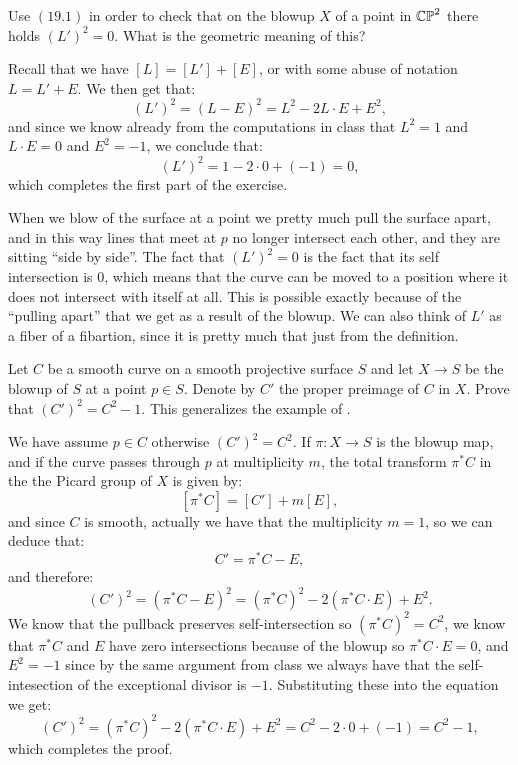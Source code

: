 \documentclass[11pt, a4paper]{article}
\begin{document}
\begin{exercise}
  \label{ex:nine-one}
  Use $(19.1)$ in order to check that on the blowup $X$ of a point
  in $\mathbb{CP}^2$ there holds $(L')^2 = 0$.
  What is the geometric meaning of this?
\end{exercise}
\begin{solution}
  Recall that we have $[L] = [L'] + [E]$,
  or with some abuse of notation $L = L' + E$.
  We then get that:
  \[
    (L')^2 =
    (L - E)^2 =
    L^2 - 2 L \cdot E + E^2,
  \]
  and since we know already from the computations in class
  that $L^2 = 1$ and $L \cdot E = 0$ and $E^2 = -1$,
  we conclude that:
  \[
    (L')^2 = 1 - 2 \cdot 0 + (-1) = 0,
  \]
  which completes the first part of the exercise.

  When we blow of the surface at a point we pretty much pull the surface
  apart, and in this way lines that meet at $p$ no longer
  intersect each other, and they are sitting ``side by side''.
  The fact that $(L')^2 = 0$ is the fact that its self intersection
  is $0$, which means that the curve can be moved to a position where it
  does not intersect with itself at all.
  This is possible exactly because of the ``pulling apart'' that we
  get as a result of the blowup.
  We can also think of $L'$ as a fiber of a fibartion,
  since it is pretty much that just from the definition.
\end{solution}

\begin{exercise}
  \label{ex:nine-two}
  Let $C$ be a smooth curve on a smooth projective surface $S$
  and let $X \to S$ be the blowup of $S$ at a point $p \in S$.
  Denote by $C'$ the proper preimage of $C$ in $X$.
  Prove that $(C')^2 = C^2 - 1$.
  This generalizes the example of .
\end{exercise}
\begin{solution}
  We have assume $p \in C$ otherwise $(C')^2 = C^2$.
  If $\pi \colon X \to S$ is the blowup map,
  and if the curve passes through $p$ at multiplicity $m$,
  the total transform $\pi^* C$ in the the Picard group of $X$
  is given by:
  \[
    [\pi^* C] = [C'] + m [E],
  \]
  and since $C$ is smooth, actually we have that the multiplicity
  $m = 1$, so we can deduce that:
  \[
    C' = \pi^* C - E,
  \]
  and therefore:
  \[
    (C')^2 =
    (\pi^* C - E)^2 =
    (\pi^* C)^2 - 2 (\pi^* C \cdot E) + E^2.
  \]
  We know that the pullback preserves self-intersection so
  $(\pi^* C)^2 = C^2$,
  we know that $\pi^* C$ and $E$ have zero intersections because
  of the blowup so $\pi^* C \cdot E = 0$,
  and $E^2 = -1$ since by the same argument from class
  we always have that the self-intesection of the exceptional
  divisor is $-1$.
  Substituting these into the equation we get:
  \[
    (C')^2 =
    (\pi^* C)^2 - 2 (\pi^* C \cdot E) + E^2 =
    C^2 - 2 \cdot 0 + (-1) = C^2 - 1,
  \]
  which completes the proof.
\end{solution}
\end{document}

